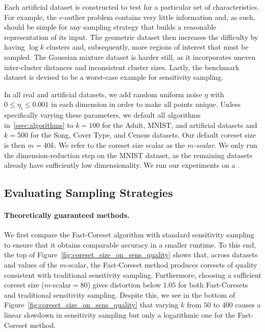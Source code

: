Each artificial dataset is constructed to test for a particular set of characteristics. For example, the $c$-outlier problem contains very little information
and, as such, should be simple for any sampling strategy that builds a reasonable representation of its input. The geometric dataset then increases the
difficulty by having $\log k$ clusters and, subsequently, more regions of interest that must be sampled. The Gaussian mixture dataset is harder still, as it
incorporates uneven inter-cluster distances and inconsistent cluster sizes. Lastly, the benchmark dataset is devised to be a worst-case example for sensitivity
sampling.

In all real and artificial datasets, we add random uniform noise $\eta$ with $0 \leq \eta_i \leq 0.001$ in each dimension in order to make all points unique.
Unless specifically varying these parameters, we default all algorithms in~\ref{ssec:algorithms} to $k=100$ for the Adult, MNIST, and artificial datasets and
$k=500$ for the Song, Cover Type, and Census datasets. Our default coreset size is then $m = 40k$. We refer to the coreset size scalar as the \emph{$m$-scalar}.
We only run the dimension-reduction step on the MNIST dataset, as the remaining datasets already have sufficiently low dimensionality. We run our experiments on
a .


\subsection{Evaluating Sampling Strategies}
\label{ssec:alg_qualities}

\paragraph*{Theoretically guaranteed methods.}



We first compare the Fast-Coreset algorithm with standard sensitivity sampling to ensure that it obtains comparable accuracy in a smaller runtime.  To this end,
the top of Figure~\ref{fig:coreset_size_on_sens_quality} shows that, across datasets and values of the $m$-scalar, the Fast-Coreset method produces coresets of
quality consistent with traditional sensitivity sampling. Furthermore, choosing a sufficient coreset size ($m$-scalar$=80$) gives distortion below $1.05$ for
both Fast-Coresets and traditional sensitivity sampling. Despite this, we see in the bottom of Figure~\ref{fig:coreset_size_on_sens_quality} that varying $k$
from $50$ to $400$ causes a linear slowdown in sensitivity sampling but only a logarithmic one for the Fast-Coreset method.

